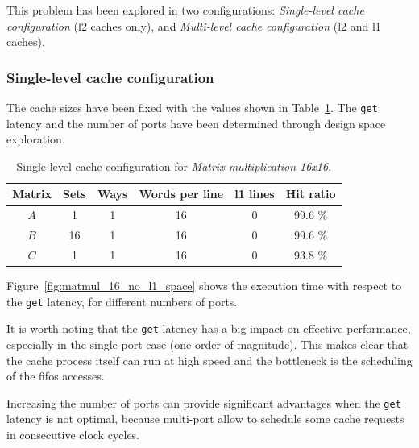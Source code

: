 \documentclass[11pt,a4paper,oneside]{memoir}
\begin{document}
This problem has been explored in two configurations: \emph{Single-level cache
configuration} (\ac{l2} caches only), and \emph{Multi-level cache
configuration} (\ac{l2} and \ac{l1} caches).

\subsubsection{Single-level cache configuration}
The cache sizes have been fixed with the values shown in
Table~\ref{tab:matmul_16_no_l1_config}. The \texttt{get} latency and the number
of ports have been determined through design space exploration.

\begin{table}[H]
	\begin{center}
		\begin{tabular}{cccccc}
			\hline
			\rowcolor{gray!50}
			\textbf{Matrix} &
			\textbf{Sets} & \textbf{Ways} & \textbf{Words per line} &
			\textbf{\ac{l1} lines} & \textbf{Hit ratio} \\
			\hline
			$A$ & 1 & 1 & 16 & 0 & 99.6 \% \\
			\rowcolor{gray!25}
			$B$ & 16 & 1 & 16 & 0 & 99.6 \% \\
			$C$ & 1 & 1 & 16 & 0 & 93.8 \% \\
			\hline
		\end{tabular}
	\end{center}
	\caption{Single-level cache configuration for \emph{Matrix
	multiplication 16x16}.}
	\label{tab:matmul_16_no_l1_config}
\end{table}

Figure~\ref{fig:matmul_16_no_l1_space} shows the execution time with respect to
the \texttt{get} latency, for different numbers of ports.

It is worth noting that the \texttt{get} latency has a big impact on effective
performance, especially in the single-port case (one order of magnitude).
This makes clear that the cache process itself can run at high speed and the
bottleneck is the scheduling of the \acp{fifo} accesses.

Increasing the number of ports can provide significant advantages when the
\texttt{get} latency is not optimal, because multi-port allow to schedule some
cache requests in consecutive clock cycles.
\end{document}
